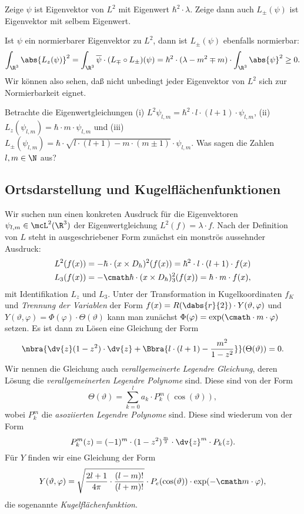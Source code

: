 \documentclass{subfiles}
\begin{document}
        \begin{Aufgabe}
            \nr{} Zeige $\psi$ ist Eigenvektor von $L^2$ mit Eigenwert $\hbar^2\cdot\lambda$. Zeige dann auch $L_\pm(\psi)$ ist Eigenvektor mit selbem Eigenwert. 
        \end{Aufgabe}

        Ist $\psi$ ein normierbarer Eigenvektor zu $L^2$, dann ist $L_\pm(\psi)$ ebenfalls normierbar:
        \[\int_{\R^3}\abs{L_z(\psi)}^2 = \int_{\R^3}\overline\psi\cdot(L_\mp\circ L_\pm)(\psi) = \hbar^2\cdot (\lambda-m^2\mp m)\cdot\int_{\R^3}\abs{\psi}^2 \geq 0.\]
        Wir können also sehen, daß nicht unbedingt jeder Eigenvektor von $L^2$ sich zur Normierbarkeit eignet. 

        \begin{Aufgabe}
            \nr{} Betrachte die Eigenwertgleichungen (i) $L^2\psi_{l,m} = \hbar^2\cdot l\cdot(l + 1)\cdot\psi_{l,m}$, (ii) $L_z(\psi_{l,m}) = \hbar\cdot m\cdot \psi_{l,m}$ und (iii) $L_\pm(\psi_{l,m}) = \hbar\cdot\sqrt{l\cdot (l+1) - m\cdot(m\pm 1)}\cdot\psi_{l,m}$. Was sagen die Zahlen $l,m\in\N$ aus?
        \end{Aufgabe}

    \subsection{Ortsdarstellung und Kugelflächenfunktionen}
        Wir suchen nun einen konkreten Ausdruck für die Eigenvektoren $\psi_{l,m}\in\mcL^2(\R^3)$ der Eigenwertgleichung $L^2(f) = \lambda\cdot f$. Nach der Definition von $L$ steht in ausgeschriebener Form zunächst ein monströs aussehnder Ausdruck:
        \begin{align*}
            L^2(f(x)) &= -\hbar\cdot(x\times D_h)^2(f(x)) = \hbar^2\cdot l\cdot (l+1)\cdot f(x)\\
            L_3(f(x)) &= -\cmath\hbar\cdot (x\times D_h)_3^2(f(x)) = \hbar\cdot m\cdot f(x),
        \end{align*}
        mit Identifikation $L_z$ und $L_3$. Unter der Transformation in Kugelkoordinaten $f_K$ und \emph{Trennung der Variablen} der Form $f(x) = R(\dabs{r}{2})\cdot Y(\vartheta,\varphi)$ und $Y(\vartheta,\varphi) = \Phi(\varphi)\cdot\Theta(\vartheta)$ kann man zunächst $\Phi(\varphi) = \exp(\cmath\cdot m\cdot\varphi)$ setzen. Es ist dann zu Lösen eine Gleichung der Form 
        \[\nbra{\dv{z}(1-z^2)\cdot\dv{z} + \Bbra{l\cdot(l+1) - \frac{m^2}{1-z^2}}}(\Theta(\vartheta)) = 0.\]
        Wir nennen die Gleichung auch \emph{verallgemeinerte Legendre Gleichung}, deren Lösung die \emph{verallgemeinerten Legendre Polynome} sind. Diese sind von der Form
        \[\Theta(\vartheta) = \sum_{k=0}^l a_k\cdot P_k^m(\cos(\vartheta)),\]
        wobei $P_k^m$ die \emph{asoziierten Legendre Polynome} sind. Diese sind wiederum von der Form
        \[P_k^m(z) = (-1)^m\cdot(1-z^2)^{\frac{m}{2}}\cdot\dv{z}^m\cdot P_k(z).\]
        Für $Y$ finden wir eine Gleichung der Form
        \[Y(\vartheta,\varphi) = \sqrt{\frac{2l + 1}{4\pi}\cdot\frac{(l-m)!}{(l+m)!}}\cdot P_e(\cos(\vartheta))\cdot\exp(-\cmath m\cdot\varphi),\]
        die sogenannte \emph{Kugelflächenfunktion}. 


    

    
\end{document}
